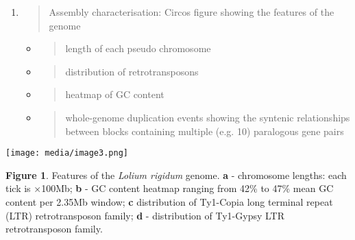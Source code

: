 \begin{enumerate}
\def\labelenumi{\arabic{enumi}.}
\item
  \begin{quote}
  Assembly characterisation: Circos figure showing the features of the
  genome
  \end{quote}

  \begin{itemize}
  \item
    \begin{quote}
    length of each pseudo chromosome
    \end{quote}
  \item
    \begin{quote}
    distribution of retrotransposons
    \end{quote}
  \item
    \begin{quote}
    heatmap of GC content
    \end{quote}
  \item
    \begin{quote}
    whole-genome duplication events showing the syntenic relationships
    between blocks containing multiple (e.g. 10) paralogous gene pairs
    \end{quote}
  \end{itemize}
\end{enumerate}

\texttt{[image: media/image3.png]}

\textbf{Figure 1}. Features of the \emph{Lolium rigidum} genome.
\textbf{a} - chromosome lengths: each tick is ×100Mb; \textbf{b} - GC
content heatmap ranging from 42\% to 47\% mean GC content per 2.35Mb
window; \textbf{c} distribution of Ty1-Copia long terminal repeat (LTR)
retrotransposon family; \textbf{d} - distribution of Ty1-Gypsy LTR
retrotransposon family.

